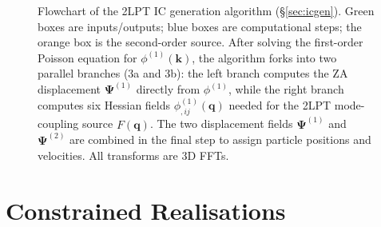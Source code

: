 \documentclass[12pt]{article}
\newcommand{\bq}{\mathbf{q}}
\newcommand{\bk}{\mathbf{k}}
\newcommand{\bPsi}{\boldsymbol{\Psi}}
\begin{document}
\begin{figure}[!t]
\caption{Flowchart of the 2LPT IC generation algorithm
(\S\ref{sec:icgen}).  Green boxes are inputs/outputs; blue boxes are
computational steps; the orange box is the second-order source.
After solving the first-order Poisson equation for $\phi^{(1)}(\bk)$,
the algorithm forks into two parallel branches (3a and 3b):
the left branch computes the ZA displacement $\bPsi^{(1)}$ directly
from $\phi^{(1)}$, while the right branch computes six Hessian fields
$\phi^{(1)}_{,ij}(\bq)$ needed for the 2LPT mode-coupling source $F(\bq)$.
The two displacement fields $\bPsi^{(1)}$ and $\bPsi^{(2)}$ are combined
in the final step to assign particle positions and velocities.
All transforms are 3D FFTs.}
\label{fig:icgen}
\end{figure}

\section{Constrained Realisations}
\label{sec:constrained}
\end{document}
